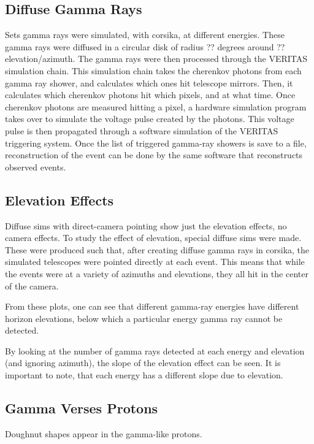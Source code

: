 \subsection{Diffuse Gamma Rays}

Sets gamma rays were simulated, with corsika, at different energies.
These gamma rays were diffused in a circular disk of radius ?? degrees around ?? elevation/azimuth.
The gamma rays were then processed through the VERITAS simulation chain.
This simulation chain takes the cherenkov photons from each gamma ray shower, and calculates which ones hit telescope mirrors.
Then, it calculates which cherenkov photons hit which pixels, and at what time.
Once cherenkov photons are measured hitting a pixel, a hardware simulation program takes over to simulate the voltage pulse created by the photons.
This voltage pulse is then propagated through a software simulation of the VERITAS triggering system.
Once the list of triggered gamma-ray showers is save to a file, reconstruction of the event can be done by the same software that reconstructs observed events.

\subsection{Elevation Effects}

Diffuse sims with direct-camera pointing show just the elevation effects, no camera effects.
To study the effect of elevation, special diffuse sims were made.
These were produced such that, after creating diffuse gamma rays in corsika, the simulated telescopes were pointed directly at each event.
This means that while the events were at a variety of azimuths and elevations, they all hit in the center of the camera.

From these plots, one can see that different gamma-ray energies have different horizon elevations, below which a particular energy gamma ray cannot be detected.

By looking at the number of gamma rays detected at each energy and elevation (and ignoring azimuth), the slope of the elevation effect can be seen.
It is important to note, that each energy has a different slope due to elevation.


\subsection{Gamma Verses Protons}

Doughnut shapes appear in the gamma-like protons.


